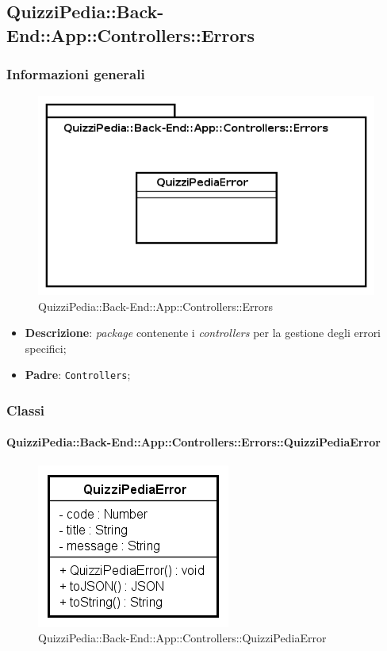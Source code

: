 \subsection{QuizziPedia::Back-End::App::Controllers::Errors}
\subsubsection{Informazioni generali}
\label{QuizziPedia::Back-End::App::Controllers::Errors}
\begin{figure}[ht]
	\centering
	\includegraphics[scale=0.8]{UML/Package/QuizziPedia_Back-End_App_Controllers_Errors.png}
	\caption{QuizziPedia::Back-End::App::Controllers::Errors}
\end{figure}
\FloatBarrier


	\begin{itemize}
		\item \textbf{Descrizione}:
		\textit{package} contenente i \textit{controllers}  per la gestione degli errori specifici;
		\item \textbf{Padre}: \texttt{Controllers};
	\end{itemize}
\subsubsection{Classi}
\paragraph[QuizziPedia::Back-End::App::Controllers::Errors\\::QuizziPediaError]{QuizziPedia::Back-End::App::Controllers::Errors::QuizziPediaError}
\begin{figure}[ht]
	\centering
	\includegraphics[scale=0.8]{UML/Classi/Back-End/QuizziPedia_Back-End_App_Controllers_Errors_QuizziPediaError.png}
	\caption{QuizziPedia::Back-End::App::Controllers::QuizziPediaError}
\end{figure}
\FloatBarrier


